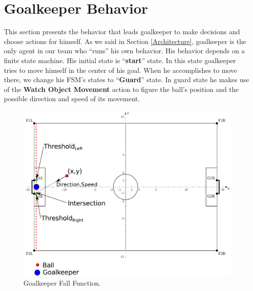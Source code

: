 \section{Goalkeeper Behavior}
This section presents the behavior that leads goalkeeper to make decisions and choose actions for himself. As we said in Section \ref{Architecture}, goalkeeper is the only agent in our team who ``runs'' his own behavior. His behavior depends on a finite state machine. His initial state is ``\textbf{start}'' state. In this state goalkeeper tries to move himself in the center of his goal. When he accomplishes to move there, we change his FSM's states to ``\textbf{Guard}'' state. In guard state he makes use of the \textbf{Watch Object Movement}  action to figure the ball's position and the possible direction and speed of its movement.
\begin{figure}[!h]
\centering
  \includegraphics[trim = 0cm 0cm 10cm 0cm, clip,scale=0.6]{Chapter3/figures/Goalie.pdf}  
  \caption{Goalkeeper Fall Function.}
  \label{fig:Goalkeeper}
\end{figure} 
